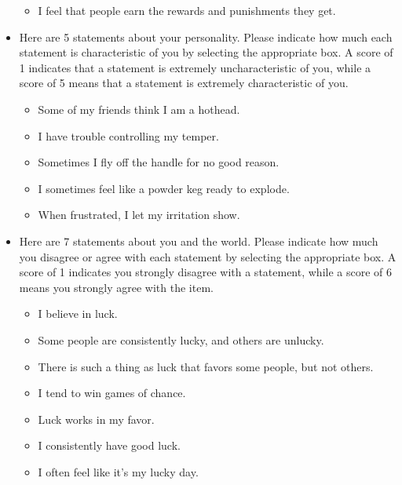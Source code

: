 \begin{itemize}
\begin{itemize}
	\item I feel that people earn the rewards and punishments they get.
	\end{itemize}
    \item Here are 5 statements about your personality. Please indicate how
    much each statement is characteristic of you by selecting the appropriate
    box. A score of 1 indicates that a statement is extremely uncharacteristic
    of you, while a score of 5 means that a statement is extremely
    characteristic of you.
    \begin{itemize}
	\item Some of my friends think I am a hothead.
	\item I have trouble controlling my temper.
	\item Sometimes I fly off the handle for no good reason.
	\item I sometimes feel like a powder keg ready to explode.
	\item When frustrated, I let my irritation show.
    \end{itemize}
    \item Here are 7 statements about you and the world. Please indicate how
    much you disagree or agree with each statement by selecting the appropriate
    box. A score of 1 indicates you strongly disagree with a statement, while a
    score of 6 means you strongly agree with the item.
    \begin{itemize}
    \item I believe in luck.
	\item Some people are consistently lucky, and others are unlucky.
	\item There is such a thing as luck that favors some people, but not others.
	\item I tend to win games of chance.
	\item Luck works in my favor.
	\item I consistently have good luck.
	\item I often feel like it's my lucky day.
\end{itemize}
\end{itemize}

